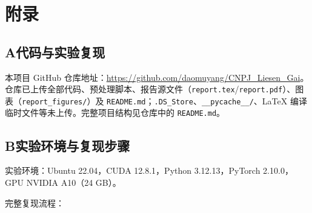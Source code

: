 \documentclass[UTF8,a4paper,12pt]{ctexart}
\begin{document}
\section*{附录}

\subsection*{A\quad 代码与实验复现}

本项目 GitHub 仓库地址：\url{https://github.com/daomuyang/CNPJ_Liesen_Gai}。仓库已上传全部代码、预处理脚本、报告源文件（\texttt{report.tex}/\texttt{report.pdf}）、图表（\texttt{report\_figures/}）及 \texttt{README.md}；\texttt{.DS\_Store}、\texttt{\_\_pycache\_\_/}、LaTeX 编译临时文件等未上传。完整项目结构见仓库中的 \texttt{README.md}。

\subsection*{B\quad 实验环境与复现步骤}

实验环境：Ubuntu 22.04，CUDA 12.8.1，Python 3.12.13，PyTorch 2.10.0，GPU NVIDIA A10（24 GB）。

完整复现流程：
\end{document}
